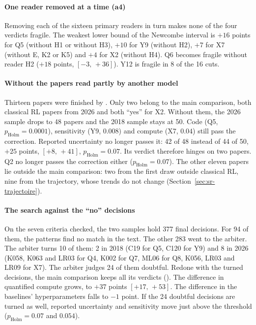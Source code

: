 \paragraph{One reader removed at a time (a4)}
Removing each of the sixteen primary readers in turn makes none of the four verdicts fragile. The
weakest lower bound of the Newcombe interval is $+16$ points for Q5 (without H1 or without H3), $+10$
for Y9 (without H2), $+7$ for X7 (without E, K2 or K5) and $+4$ for X2 (without H4). Q6 becomes fragile
without reader H2 ($+18$ points, $[-3,\,+36]$). Y12 is fragile in 8 of the 16 cuts.

\paragraph{Without the papers read partly by another model}
Thirteen papers were finished by . Only two belong to the main
comparison, both classical RL papers from 2026 and both \enquote{yes} for X2. Without them, the 2026
sample drops to 48 papers and the 2018 sample stays at 50. Code (Q5, $p_{\text{Holm}} = 0.0001$),
sensitivity (Y9, $0.008$) and compute (X7, $0.04$) still pass the correction. Reported uncertainty no
longer passes it: 42 of 48 instead of 44 of 50, $+25$ points, $[+8,\,+41]$, $p_{\text{Holm}} = 0.07$.
Its verdict therefore hinges on two papers. Q2 no longer passes the correction either
($p_{\text{Holm}} = 0.07$). The other eleven papers lie outside the main comparison: two from the
first draw outside classical RL, nine from the trajectory, whose trends do not change
(Section~\ref{sec:sr-trajectoire}).

\paragraph{The search against the \enquote{no} decisions}
On the seven criteria checked, the two samples hold 377 final  decisions. For 94 of them, the
patterns find no match in the text. The other 283 went to the arbiter. The arbiter
turns 10 of them: 2 in 2018 (C19 for Q5, C120 for Y9) and 8 in 2026 (K058, K063 and LR03 for Q4, K002
for Q7, ML06 for Q8, K056, LR03 and LR09 for X7). The arbiter judges 24 of them doubtful. Redone with the
turned decisions, the main comparison keeps all its verdicts (). The difference
in quantified compute grows, to $+37$ points $[+17,\,+53]$. The difference in the baselines' hyperparameters
falls to $-1$ point. If the 24 doubtful decisions are turned as well, reported uncertainty and
sensitivity move just above the threshold ($p_{\text{Holm}} = 0.07$ and $0.054$).

